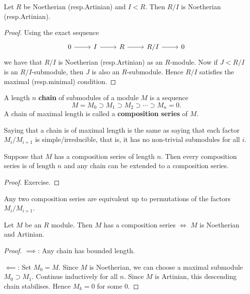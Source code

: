 \begin{prop}[3.7]
  Let $R$ be Noetherian (resp.\@ Artinian) and $I<R$.
  Then $R/I$ is Noetherian (resp.\@ Artinian).
\end{prop}

\begin{proof}
  Using the exact sequence
  \begin{equation*}
    \begin{tikzcd}
      0 \ar[r] & I \ar[r] & R \ar[r] & R/I \ar[r] & 0
    \end{tikzcd}
  \end{equation*}
  we have that $R/I$ is Noetherian (resp.\@ Artinian) as an $R$-module.
  Now if $J<R/I$ is an $R/I$-submodule, then $J$ is also an $R$-submodule.
  Hence $R/I$ satisfies the maximal (resp.\@ minimal) condition.
\end{proof}

\begin{defn}
  A length $n$ \textbf{chain} of submodules of a module $M$ is a sequence
  \[ M = M_0 \supset M_1 \supset M_2 \supset \cdots \supset M_n=0. \]
  A chain of maximal length is called a \textbf{composition series} of $M$.
\end{defn}

\begin{rmk}
  Saying that a chain is of maximal length is the same as saying that each factor $M_i/M_{i+1}$ is simple/irreducible, that is, it has no non-trivial submodules for all $i$.
\end{rmk}

\begin{prop}[3.9]
  Suppose that $M$ has a composition series of length $n$.  
  Then every composition series is of length $n$ and any chain can be extended to a composition series.
\end{prop}

\begin{proof}
  Exercise.
\end{proof}

\begin{rmk}
  Any two composition series are equivalent up to permutations of the factors $M_i/M_{i+1}$.
\end{rmk}

\begin{prop}[3.10]
  Let $M$ be an $R$ module.
  Then $M$ has a composition series $\iff$ $M$ is Noetherian and Artinian.
\end{prop}

\begin{proof}
  $\implies$:
  Any chain has bounded length.

  $\impliedby$:
  Set $M_0=M$.
  Since $M$ is Noetherian, we can choose a maximal submodule $M_0 \supset M_1$.
  Continue inductively for all $n$.
  Since $M$ is Artinian, this descending chain stabilises.
  Hence $M_k=0$ for some $0$.
\end{proof}

